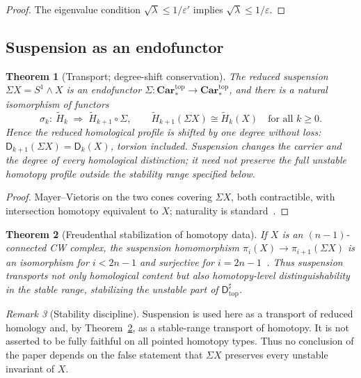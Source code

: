 \documentclass[11pt,a4paper]{article}
\newtheorem{theorem}{Theorem}[section]
\theoremstyle{definition}
\theoremstyle{remark}
\newtheorem{remark}[theorem]{Remark}
\newcommand{\Sone}{S^{1}}
\newcommand{\rH}{\widetilde H}
\newcommand{\Dd}{\mathsf{D}}
\newcommand{\Dtop}{\mathsf{D}^{\sharp}_{\mathrm{top}}}
\newcommand{\Car}{\mathbf{Car}}
\begin{document}
\begin{proof}
The eigenvalue condition $\sqrt\lambda\le1/\varepsilon'$ implies $\sqrt\lambda\le1/\varepsilon$.
\end{proof}

\subsection{Suspension as an endofunctor}

\begin{theorem}[Transport; degree-shift conservation]
\label{thm:transport}
The reduced suspension $\Sigma X=\Sone\wedge X$ is an endofunctor
$\Sigma:\Car^{\mathrm{top}}_{\ast}\to\Car^{\mathrm{top}}_{\ast}$, and there is a natural
isomorphism of functors
\begin{equation}
\sigma_{k}:\ \rH_{k}\;\Longrightarrow\;\rH_{k+1}\circ\Sigma,
\qquad
\rH_{k+1}(\Sigma X)\cong\rH_{k}(X)\quad\text{for all }k\ge0 .
\end{equation}
Hence the reduced homological profile is shifted by one degree without loss:
$\Dd_{k+1}(\Sigma X)=\Dd_{k}(X)$, torsion included.  Suspension changes the carrier and the
degree of every homological distinction; it need not preserve the full unstable homotopy profile
outside the stability range specified below.
\end{theorem}

\begin{proof}
Mayer--Vietoris on the two cones covering $\Sigma X$, both contractible, with intersection
homotopy equivalent to $X$; naturality is standard~\cite{Hatcher2002}.
\end{proof}

\begin{theorem}[Freudenthal stabilization of homotopy data]
\label{thm:freudenthal}
If $X$ is an $(n{-}1)$-connected CW complex, the suspension homomorphism
$\pi_{i}(X)\to\pi_{i+1}(\Sigma X)$ is an isomorphism for $i<2n-1$ and surjective for
$i=2n-1$~\cite{Hatcher2002}.  Thus suspension transports not only homological content but also
homotopy-level distinguishability in the stable range, stabilizing the unstable part of
$\Dtop$.
\end{theorem}

\begin{remark}[Stability discipline]
Suspension is used here as a transport of reduced homology and, by
Theorem~\ref{thm:freudenthal}, as a stable-range transport of homotopy.  It is not asserted to
be fully faithful on all pointed homotopy types.  Thus no conclusion of the paper depends on
the false statement that $\Sigma X$ preserves every unstable invariant of $X$.
\end{remark}
\end{document}
